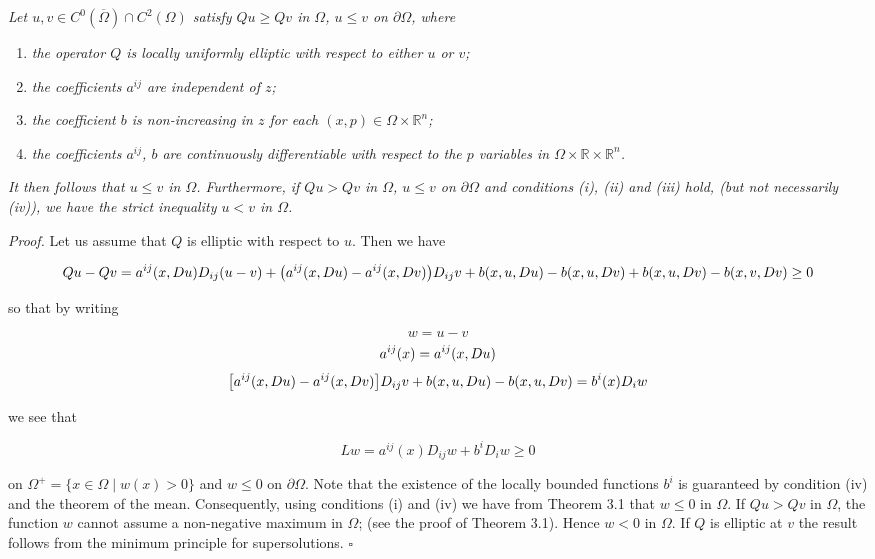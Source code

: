 \begin{theorem}\label{gilbarg-trudinger.thm.10.1.comparison-principle}
\textit{Let $u, v \in C^0(\overline{\Omega}) \cap C^2(\Omega)$ satisfy $Qu \geq Qv$ in $\Omega$, $u \leq v$ on $\partial \Omega$, where}

\begin{enumerate}
\item[(i)] \textit{the operator $Q$ is locally uniformly elliptic with respect to either $u$ or $v$;}
\item[(ii)] \textit{the coefficients $a^{ij}$ are independent of $z$;}
\item[(iii)] \textit{the coefficient $b$ is non-increasing in $z$ for each $(x,p) \in \Omega \times \mathbb{R}^n$;}
\item[(iv)] \textit{the coefficients $a^{ij}$, $b$ are continuously differentiable with respect to the $p$ variables in $\Omega \times \mathbb{R} \times \mathbb{R}^n$.}
\end{enumerate}

\medskip

\noindent\textit{It then follows that $u \leq v$ in $\Omega$. Furthermore, if $Qu > Qv$ in $\Omega$, $u \leq v$ on $\partial \Omega$ and conditions (i), (ii) and (iii) hold, (but not necessarily (iv)), we have the strict inequality $u < v$ in $\Omega$.}

\medskip

\noindent\textit{Proof.} Let us assume that $Q$ is elliptic with respect to $u$. Then we have

\[
Qu - Qv = a^{ij}(x, Du)D_{ij}(u-v) + \bigl(a^{ij}(x, Du) - a^{ij}(x, Dv)\bigr)D_{ij}v
+ b(x, u, Du) - b(x, u, Dv) + b(x, u, Dv) - b(x, v, Dv) \geq 0
\]

so that by writing

\[
w = u - v
\]
\[
a^{ij}(x) = a^{ij}(x, Du)
\]
\[
\bigl[a^{ij}(x, Du) - a^{ij}(x, Dv)\bigr]D_{ij}v + b(x, u, Du) - b(x, u, Dv) = b^i(x)D_i w
\]

we see that

\[
Lw = a^{ij}(x)D_{ij}w + b^iD_i w \geq 0
\]



on $\Omega^+ = \{x \in \Omega \mid w(x) > 0\}$ and $w \le 0$ on $\partial \Omega$. Note that the existence of the locally
bounded functions $b^i$ is guaranteed by condition (iv) and the theorem of the mean.
Consequently, using conditions (i) and (iv) we have from Theorem 3.1 that
$w \le 0$ in $\Omega$. If $Qu > Qv$ in $\Omega$, the function $w$ cannot assume a non-negative maximum
in $\Omega$; (see the proof of Theorem 3.1). Hence $w < 0$ in $\Omega$. If $Q$ is elliptic at $v$ the
result follows from the minimum principle for supersolutions. $\square$
\end{theorem}

